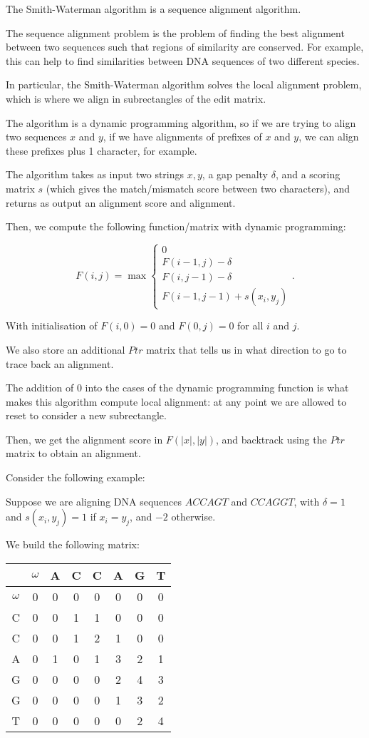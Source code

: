 


The Smith-Waterman algorithm is a sequence alignment algorithm.

The sequence alignment problem is the problem of finding the best alignment between two sequences such that regions of similarity are conserved. For example, this can help to find similarities between DNA sequences of two different species.

In particular, the Smith-Waterman algorithm solves the local alignment problem, which is where we align in subrectangles of the edit matrix.

The algorithm is a dynamic programming algorithm, so if we are trying to align two sequences $x$ and $y$, if we have alignments of prefixes of $x$ and $y$, we can align these prefixes plus 1 character, for example.

The algorithm takes as input two strings $x, y$, a gap penalty $\delta$, and a scoring matrix $s$ (which gives the match/mismatch score between two characters), and returns as output an alignment score and alignment.

Then, we compute the following function/matrix with dynamic programming:

\[
  F(i,j) = \max\begin{cases}0\\F(i-1, j) - \delta\\F(i, j-1) - \delta\\F(i-1, j-1)+ s(x_i, y_j)\end{cases}
.\] 

With initialisation of $F(i,0) = 0$ and $F(0, j) = 0$ for all $i$ and $j$.

We also store an additional $Ptr$ matrix that tells us in what direction to go to trace back an alignment.

The addition of 0 into the cases of the dynamic programming function is what makes this algorithm compute local alignment: at any point we are allowed to reset to consider a new subrectangle.

Then, we get the alignment score in $F(|x|, |y|)$, and backtrack using the $Ptr$ matrix to obtain an alignment.

Consider the following example:

Suppose we are aligning DNA sequences $ACCAGT$ and $CCAGGT$, with $\delta = 1$ and $s(x_i, y_j) = 1$ if $x_i = y_j$, and $-2$ otherwise.

We build the following matrix:

\begin{tabular}{c|c|c|c|c|c|c|c}
  &$\omega$&A&C&C&A&G&T\\
  \hline
  $\omega$&0&0&0&0&0&0&0\\
  \hline
  C&0&0&1&1&0&0&0\\
  \hline
  C&0&0&1&2&1&0&0\\
  \hline
  A&0&1&0&1&3&2&1\\
  \hline
  G&0&0&0&0&2&4&3\\
  \hline
  G&0&0&0&0&1&3&2\\
  \hline
  T&0&0&0&0&0&2&4
\end{tabular}


